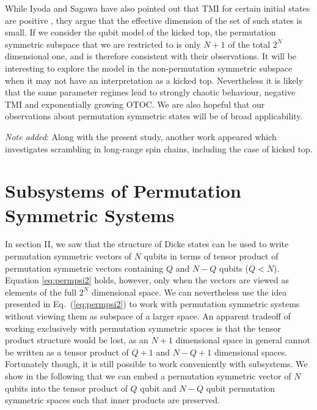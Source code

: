 \documentclass[pre,aps,showpacs,showkeys,twocolumn]{revtex4-1}
\theoremstyle{definition}
\theoremstyle{remark}
\begin{document}
While Iyoda and Sagawa have also pointed out that TMI for certain initial states are positive \cite{IyodaSagawa}, they argue that the effective dimension of the set of such states is small. If we consider the qubit model of the kicked top, the permutation symmetric subspace that we are restricted to is only $N + 1$ of the total $2^N$ dimensional one, and is therefore consistent with their observations. It will be interesting to explore the model in the non-permutation symmetric subspace when it may not have an interpretation as a kicked top. Nevertheless it is likely that the same parameter regimes lead to strongly chaotic behaviour, negative TMI and exponentially growing OTOC. We are also hopeful that our observations about permutation symmetric states will be of broad applicability.

\textit{Note added}: Along with the present study, another work appeared \cite{pappalardi2018scrambling} which investigates scrambling in long-range spin chains, including the case of kicked top.



\appendix
\section{\label{apdx:permsymmembedding}Subsystems of Permutation Symmetric Systems}
In section II, we saw that the structure of Dicke states can be used to write permutation symmetric vectors of $N$ qubits in terms of tensor product of permutation symmetric vectors containing $Q$ and $N - Q$ qubits ($Q < N$). Equation \ref{eq:permpsi2} holds, however, only when the vectors are viewed as elements of the full $2^N$ dimensional space. We can nevertheless use the idea presented in Eq.~(\ref{eq:permpsi2}) to work with permutation symmetric systems without viewing them as subspace of a larger space. An apparent tradeoff of working exclusively with permutation symmetric spaces is that the tensor product structure would be lost, as an $N + 1$ dimensional space in general cannot be written as a tensor product of $Q + 1$ and $N - Q + 1$ dimensional spaces. Fortunately though, it is still possible to work conveniently with subsystems. We show in the following that we can embed a permutation symmetric vector of $N$ qubits into the tensor product of $Q$ qubit and $N - Q$ qubit permutation symmetric spaces such that inner products are preserved.
\end{document}
